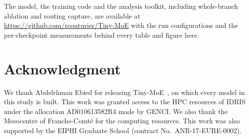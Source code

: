 \documentclass[conference,11pt]{IEEEtran}
\begin{document}
The model, the training code and the analysis toolkit, including whole-branch ablation and routing
capture, are available at \url{https://github.com/rcouturier/Tiny-MoE} with the run configurations and the per-checkpoint
measurements behind every table and figure here. 

\section*{Acknowledgment}

We thank Abdelrhman Ebied for releasing Tiny-MoE~\cite{ebied2026tinymoe}, on which every model in
this study is built. This work was granted access to the HPC resources of IDRIS under the
allocation AD010613582R4 made by GENCI. We also thank the Mesocentre of Franche-Comt\'e for the
computing resources. This work was also supported by the EIPHI Graduate School (contract
No.\ ANR-17-EURE-0002).

{\footnotesize


}
\end{document}
